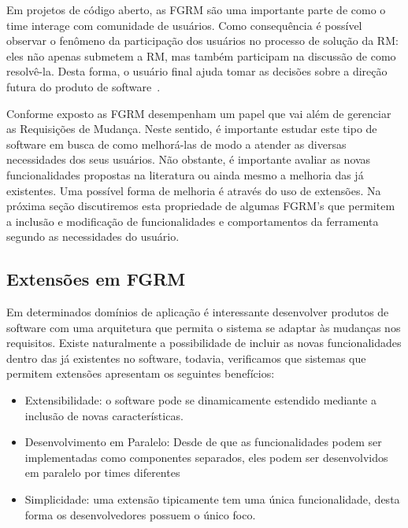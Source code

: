 Em projetos de código aberto, as FGRM são uma importante parte de como o time
interage com comunidade de usuários. Como consequência é possível observar o
fenômeno da participação dos usuários no processo de solução da RM: eles não
apenas submetem a RM, mas também participam na discussão de como resolvê-la.
Desta forma, o usuário final ajuda tomar as decisões sobre a direção futura do
produto de software~\cite{breu2010information}.

Conforme exposto as FGRM desempenham um papel que vai além de gerenciar as
Requisições de Mudança.  Neste sentido, é importante estudar este tipo de
software em busca de como melhorá-las de modo a atender as diversas necessidades
dos seus usuários. Não obstante, é importante avaliar as novas funcionalidades
propostas na literatura ou ainda mesmo a melhoria das já existentes. Uma
possível forma de melhoria é através do uso de extensões. Na próxima seção
discutiremos esta propriedade de algumas FGRM's que permitem a inclusão e
modificação de funcionalidades e comportamentos da ferramenta segundo as
necessidades do usuário. 

\subsection{Extensões em FGRM}
\label{subsec:extensoes_fgrm}

Em determinados domínios de aplicação é interessante desenvolver produtos de
software com uma arquitetura que permita o sistema se adaptar às mudanças nos
requisitos. Existe naturalmente a possibilidade de incluir as novas
funcionalidades dentro das já existentes no software, todavia, verificamos que
sistemas que permitem extensões apresentam os seguintes benefícios:

\begin{itemize}
	\item Extensibilidade: o software pode se dinamicamente estendido mediante a
		inclusão de novas características.
	\item Desenvolvimento em Paralelo: Desde de que as funcionalidades podem ser
		implementadas como componentes separados, eles podem ser desenvolvidos
		em paralelo por times diferentes
	\item Simplicidade: uma  extensão tipicamente tem uma única funcionalidade,
		desta forma os desenvolvedores possuem o único foco.
\end{itemize}


